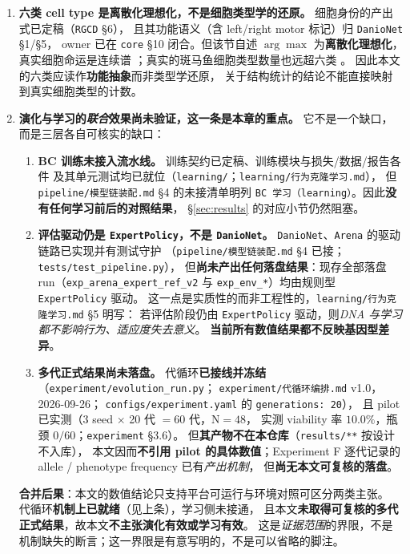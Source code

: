 \begin{enumerate}
  \item \textbf{六类 cell type 是离散化理想化，不是细胞类型学的还原。}
  细胞身份的产出式已定稿（\texttt{RGCD} \S6），
  且其功能语义（含 left/right motor 标记）归 \texttt{DanioNet} \S1/\S5，
  owner 已在 \texttt{core} \S10 闭合。但该节自述 $\arg\max$ 为\textbf{离散化理想化}，
  真实细胞命运是连续谱 \citep{bib75_moris2016}；真实的斑马鱼细胞类型数量也远超六类
  \citep{bib84_kunst2019}。
  因此本文的六类应读作\textbf{功能抽象}而非类型学还原，
  关于结构统计的结论不能直接映射到真实细胞类型的计数。

  \item \textbf{演化与学习的\emph{联合}效果尚未验证，这一条是本章的重点。}
  它不是一个缺口，而是三层各自可核实的缺口：
  \begin{enumerate}
    \item \textbf{BC 训练未接入流水线。} 训练契约已定稿、训练模块与损失/数据/报告各件
          及其单元测试均已就位（\texttt{learning/}；\texttt{learning/行为克隆学习.md}），
          但 \texttt{pipeline/模型链装配.md} \S4 的未接清单明列
          \texttt{BC 学习（learning）}。因此\textbf{没有任何学习前后的对照结果}，
          \S\ref{sec:results} 的对应小节仍然阻塞。
    \item \textbf{评估驱动仍是 \texttt{ExpertPolicy}，不是 \texttt{DanioNet}。}
          \texttt{DanioNet}、\texttt{Arena} 的驱动链路已实现并有测试守护
          （\texttt{pipeline/模型链装配.md} \S4 已接；\texttt{tests/test\_pipeline.py}），
          但\textbf{尚未产出任何落盘结果}：现存全部落盘 run（\texttt{exp\_arena\_expert\_ref\_v2}
          与 \texttt{exp\_env\_*}）均由规则型 \texttt{ExpertPolicy} 驱动。
          这一点是实质性的而非工程性的，\texttt{learning/行为克隆学习.md} \S5 明写：
          若评估阶段仍由 \texttt{ExpertPolicy} 驱动，则\emph{DNA 与学习都不影响行为、适应度失去意义}。
          \textbf{当前所有数值结果都不反映基因型差异}。
    \item \textbf{多代正式结果尚未落盘。}
          代循环\textbf{已接线并冻结}（\texttt{experiment/evolution\_run.py}；
          \texttt{experiment/代循环编排.md} v1.0，2026-09-26；
          \texttt{configs/experiment.yaml} 的 \texttt{generations: 20}），
          且 pilot 已实测（3 seed $\times$ 20 代 $=60$ 代，N$=48$，
          实测 viability 率 $10.0\%$，瓶颈 $0/60$；\texttt{experiment} \S{}3.6）。
          但\textbf{其产物不在本仓库}（\texttt{results/**} 按设计不入库），
          本文因而\textbf{不引用 pilot 的具体数值}；Experiment F 逐代记录的
          allele / phenotype frequency 已有\emph{产出机制}，
          但\textbf{尚无本文可复核的落盘}。
  \end{enumerate}
  \textbf{合并后果}：本文的数值结论只支持平台可运行与环境对照可区分两类主张。
  代循环\textbf{机制上已就绪}（见上条），学习侧未接通，
  且本文\textbf{未取得可复核的多代正式结果}，故本文\textbf{不主张演化有效或学习有效}。
  这是\emph{证据范围}的界限，不是机制缺失的断言；这一界限是有意写明的，不是可以省略的脚注。


\end{enumerate}
